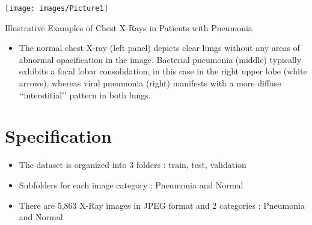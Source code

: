 {
	\begin{center}
		\texttt{[image: images/Picture1]}
	
		{Illustrative Examples of Chest X-Rays in Patients with Pneumonia}
	\end{center}	
}



{ 

	\begin{itemize}
		
	\item 	The normal chest X-ray (left panel) depicts clear lungs without any areas of abnormal opacification in the image. Bacterial pneumonia (middle) typically exhibits a focal lobar consolidation, in this case in the right upper lobe (white arrows), whereas viral pneumonia (right) manifests with a more diffuse ‘‘interstitial’’ pattern in both lungs.\cite{kermany2018identifying}


\end{itemize}
}


\section{Specification}

{ 
 \begin{itemize}
       \item The dataset is organized into 3 folders : train, test, validation
     
       \item  Subfolders for each image category : Pneumonia and Normal
     
       \item  There are 5,863 X-Ray images in JPEG format and 2 categories : Pneumonia and Normal
  
  \end{itemize}

}
{ 
%	
	\printbibliography %
}







